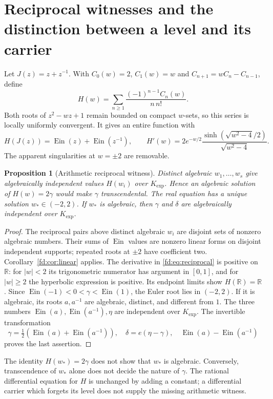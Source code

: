 \documentclass[11pt,a4paper]{article}
\newcommand{\R}{\mathbb R}
\newcommand{\Ein}{\operatorname{Ein}}
\newtheorem{proposition}[theorem]{Proposition}
\theoremstyle{definition}
\theoremstyle{remark}
\numberwithin{equation}{section}
\begin{document}
\section{Reciprocal witnesses and the distinction between a level and its carrier}
\label{fd:sec:reciprocal}
Let $J(z)=z+z^{-1}$.  With $C_0(w)=2$, $C_1(w)=w$ and
$C_{n+1}=wC_n-C_{n-1}$, define
\[
 H(w)=\sum_{n\ge1}\frac{(-1)^{n-1}C_n(w)}{n\,n!}.
\]
Both roots of $z^2-wz+1$ remain bounded on compact $w$-sets, so this
series is locally uniformly convergent.  It gives an entire function with
\begin{equation}\label{fd:eq:reciprocal}
 H(J(z))=\Ein(z)+\Ein(z^{-1}),\qquad
 H'(w)=2e^{-w/2}\frac{\sinh(\sqrt{w^2-4}/2)}{\sqrt{w^2-4}}.
\end{equation}
The apparent singularities at $w=\pm2$ are removable.

\begin{proposition}[Arithmetic reciprocal witness]\label{fd:prop:reciprocal}
Distinct algebraic $w_1,\ldots,w_s$ give algebraically independent values
$H(w_i)$ over $K_{\exp}$.  Hence an algebraic solution of
$H(w)=2\gamma$ would make $\gamma$ transcendental.
The real equation has a unique solution $w_*\in(-2,2)$.  If $w_*$ is
algebraic, then $\gamma$ and $\delta$ are algebraically independent over
$K_{\exp}$.
\end{proposition}
\begin{proof}
The reciprocal pairs above distinct algebraic $w_i$ are disjoint sets of
nonzero algebraic numbers.  Their sums of $\Ein$ values are nonzero linear
forms on disjoint independent supports; repeated roots at $\pm2$ have
coefficient two.  Corollary~\ref{fd:cor:linear} applies.
The derivative in \eqref{fd:eq:reciprocal} is positive on $\R$: for
$|w|<2$ its trigonometric numerator has argument in $[0,1]$, and for
$|w|\ge2$ the hyperbolic expression is positive.  Its endpoint limits
show $H(\R)=\R$.  Since $\Ein(-1)<0<\gamma<\Ein(1)$, the Euler root
lies in $(-2,2)$.
If it is algebraic, its roots $a,a^{-1}$ are algebraic, distinct, and
different from $1$.  The three numbers
$\Ein(a),\Ein(a^{-1}),\eta$ are independent over $K_{\exp}$.
The invertible transformation
\[
 \gamma=\tfrac12(\Ein(a)+\Ein(a^{-1})),\quad
 \delta=e(\eta-\gamma),\quad
 \Ein(a)-\Ein(a^{-1})
\]
proves the last assertion.
\end{proof}

The identity $H(w_*)=2\gamma$ does not show that $w_*$ is algebraic.
Conversely, transcendence of $w_*$ alone does not decide the nature of
$\gamma$.  The rational differential equation for $H$ is unchanged by
adding a constant; a differential carrier which forgets its level does
not supply the missing arithmetic witness.
\end{document}
